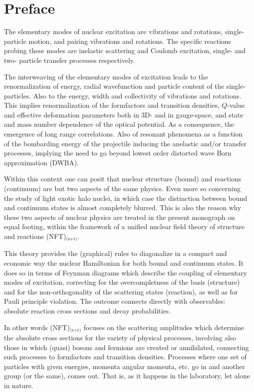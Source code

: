  \chapter*{Preface}\label{preface}
The elementary modes of nuclear excitation are vibrations and rotations, single-particle  motion, and pairing vibrations and rotations. The specific reactions probing these modes are inelastic scattering and Coulomb excitation,  single- and two- particle transfer processes respectively. 

The interweaving of the elementary modes of excitation leads to the renormalization of  energy, radial wavefunction and particle content of the single-particles. Also to the energy, width and collectivity of vibrations and rotations. This implies renormalization of the formfactors and transition densities, $Q$-value and effective deformation parameters both in 3D- and in gauge-space, and state and mass number dependence of the optical potential. As a consequence, the emergence of long range correlations. Also of resonant phenomena as a function of the bombarding energy of the projectile inducing the anelastic and/or transfer processes, implying  the need to go beyond lowest order distorted wave Born approximation (DWBA).

Within this context one can posit that nuclear structure (bound) and reactions (continuum) are but two aspects of the same physics.  Even more so concerning the study of light exotic halo nuclei, in which case the distinction between bound and continuum states is almost completely blurred. This is also the reason why these two aspects of nuclear physics are treated in the present monograph on equal footing,  within the framework of a unified nuclear field theory of structure and reactions (NFT)$_\text{(s+r)}$. 


This theory provides the (graphical) rules to diagonalize in a compact and economic way the nuclear Hamiltonian for both bound and continuum states. It does so in terms of Feynman diagrams which describe the coupling of elementary modes of excitation, correcting for the overcompletness of the basis  (structure) and for the  non-orthogonality of the scattering states (reaction), as well as for Pauli principle violation. The outcome connects directly with observables: absolute reaction cross sections and decay probabilities. 


In other words (NFT)$_\text{(s+r)}$ focuses on the scattering amplitudes which determine the absolute cross sections for the variety of physical processes, involving also those in which (quasi) bosons and fermions are created or annihilated, connecting such processes to formfactors and transition densities. Processes where one set of particles with given energies, momenta angular momenta, etc. go in and another group (or the same), comes out. That is, as it happens in the laboratory, let alone in nature.


